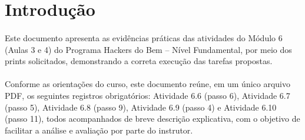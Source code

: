 \section{Introdução}

\paragraph{}
Este documento apresenta as evidências práticas das atividades do Módulo 6
(Aulas 3 e 4) do Programa Hackers do Bem -- Nível Fundamental, por meio dos
prints solicitados, demonstrando a correta execução das tarefas propostas.

\paragraph{}
Conforme as orientações do curso, este documento reúne, em um único arquivo
PDF, os seguintes registros obrigatórios: Atividade 6.6 (passo 6), Atividade
6.7 (passo 5), Atividade 6.8 (passo 9), Atividade 6.9 (passo 4) e Atividade
6.10 (passo 11), todos acompanhados de breve descrição explicativa, com o
objetivo de facilitar a análise e avaliação por parte do instrutor.
